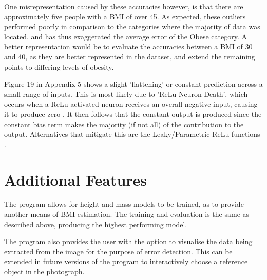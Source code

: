 \documentclass[conference]{IEEEtran}
\begin{document}
One misrepresentation caused by these accuracies however, is that there are approximately five people with a BMI of over 45.
As expected, these outliers performed poorly in comparison to the categories where the majority of data was located, and has thus exaggerated the average error of the Obese category.
A better representation would be to evaluate the accuracies between a BMI of 30 and 40, as they are better represented in the dataset, and extend the remaining points to differing levels of obesity.

Figure 19 in Appendix 5 shows a slight 'flattening' or constant prediction across a small range of inputs.
This is most likely due to 'ReLu Neuron Death', which occurs when a ReLu-activated neuron receives an overall negative input, causing it to produce zero \cite{reludeath}.
It then follows that the constant output is produced since the constant bias term makes the majority (if not all) of the contribution to the output.
Alternatives that mitigate this are the Leaky/Parametric ReLu functions \cite{reludeath}.

\section{Additional Features}
The program allows for height and mass models to be trained, as to provide another means of BMI estimation.
The training and evaluation is the same as described above, producing the highest performing model.

The program also provides the user with the option to visualise the data being extracted from the image for the purpose of error detection.
This can be extended in future versions of the program to interactively choose a reference object in the photograph.
\end{document}
